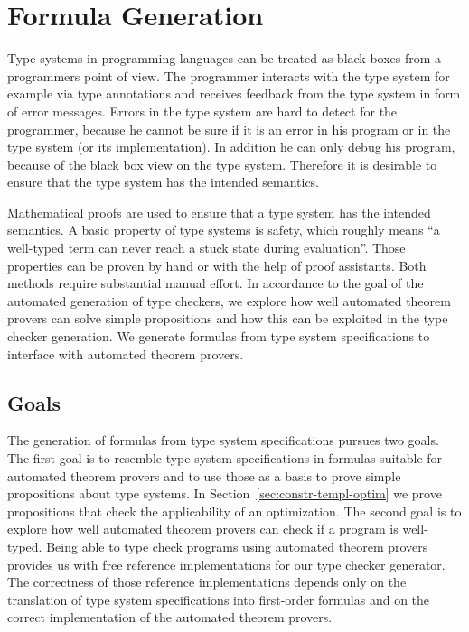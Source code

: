 \chapter{Formula Generation}
\label{ch:formula-generation}
Type systems in programming languages can be treated as black boxes
from a programmers point of view. The programmer interacts with the
type system for example via type annotations and receives feedback
from the type system in form of error messages. Errors in the type
system are hard to detect for the programmer, because he cannot be
sure if it is an error in his program or in the type system (or its
implementation). In addition he can only debug his program, because of
the black box view on the type system. Therefore it is desirable to
ensure that the type system has the intended semantics.

Mathematical proofs are used to ensure that a type system has the
intended semantics. A basic property of type systems is safety, which
roughly means ``a well-typed term can never reach a stuck state during
evaluation''\cite{Pierce:2002:TPL:509043}. Those properties can be
proven by hand or with the help of proof assistants. Both methods
require substantial manual effort. In accordance to the goal of the
automated generation of type checkers, we explore how well automated
theorem provers can solve simple propositions and how this can be
exploited in the type checker generation. We generate formulas from
type system specifications to interface with automated theorem
provers.
 
\section{Goals}
The generation of formulas from type system specifications pursues two
goals. The first goal is to resemble type system specifications in
formulas suitable for automated theorem provers and to use those as a
basis to prove simple propositions about type systems. In
Section~\ref{sec:constr-templ-optim} we prove propositions that check
the applicability of an optimization. The second goal is to explore
how well automated theorem provers can check if a program is
well-typed. Being able to type check programs using automated theorem
provers provides us with free reference implementations for our type
checker generator. The correctness of those reference implementations
depends only on the translation of type system specifications into
first-order formulas and on the correct implementation of the
automated theorem provers.

